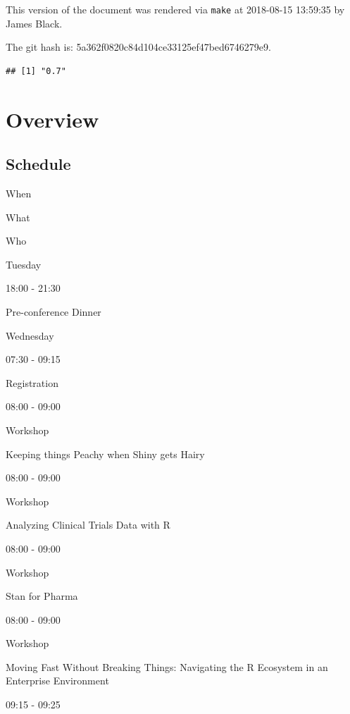 \documentclass[]{book}
\makeatletter
\newenvironment{Shaded}{\begin{snugshade}}{\end{snugshade}}
\newcommand{\KeywordTok}[1]{\textcolor[rgb]{0.13,0.29,0.53}{\textbf{#1}}}
\newcommand{\NormalTok}[1]{#1}
\newcommand{\OperatorTok}[1]{\textcolor[rgb]{0.81,0.36,0.00}{\textbf{#1}}}
\newcommand{\StringTok}[1]{\textcolor[rgb]{0.31,0.60,0.02}{#1}}
\newenvironment{kframe}{%
\medskip{}
\setlength{\fboxsep}{.8em}
 \def\at@end@of@kframe{}%
 \ifinner\ifhmode%
  \def\at@end@of@kframe{\end{minipage}}%
  \begin{minipage}{\columnwidth}%
 \fi\fi%
 \def\FrameCommand##1{\hskip\@totalleftmargin \hskip-\fboxsep
 \colorbox{shadecolor}{##1}\hskip-\fboxsep
     \hskip-\linewidth \hskip-\@totalleftmargin \hskip\columnwidth}%
 \MakeFramed {\advance\hsize-\width
   \@totalleftmargin\z@ \linewidth\hsize
   \@setminipage}}%
 {\par\unskip\endMakeFramed%
 \at@end@of@kframe}
\renewenvironment{Shaded}{\begin{kframe}}{\end{kframe}}
\theoremstyle{definition}
\theoremstyle{definition}
\theoremstyle{definition}
\theoremstyle{remark}
\makeatother
\begin{document}
This version of the document was rendered via \texttt{make} at
2018-08-15 13:59:35 by James Black.

The git hash is: 5a362f0820c84d104ce33125ef47bed6746279e9.

\begin{Shaded}
\end{Shaded}

\begin{verbatim}
## [1] "0.7"
\end{verbatim}

\hypertarget{part-overview}{%
\part{Overview}\label{part-overview}}

\hypertarget{schedule}{%
\chapter{Schedule}\label{schedule}}

When

What

Who

Tuesday

18:00 - 21:30

Pre-conference Dinner

Wednesday

07:30 - 09:15

Registration

08:00 - 09:00

Workshop

Keeping things Peachy when Shiny gets Hairy

08:00 - 09:00

Workshop

Analyzing Clinical Trials Data with R

08:00 - 09:00

Workshop

Stan for Pharma

08:00 - 09:00

Workshop

Moving Fast Without Breaking Things: Navigating the R Ecosystem in an
Enterprise Environment

09:15 - 09:25
\end{document}
